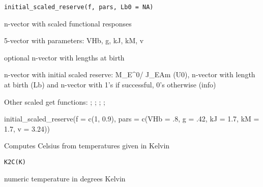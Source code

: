 \documentclass[a4paper]{book}
\begin{document}
%
\begin{Usage}
\begin{verbatim}
initial_scaled_reserve(f, pars, Lb0 = NA)
\end{verbatim}
\end{Usage}
%
\begin{Arguments}
\begin{ldescription}
\item[\code{f}] n-vector with scaled functional responses

\item[\code{pars}] 5-vector with parameters: VHb, g, kJ, kM, v

\item[\code{Lb0}] optional n-vector with lengths at birth
\end{ldescription}
\end{Arguments}
%
\begin{Value}
n-vector with initial scaled reserve: M\_E\textasciicircum{}0/ J\_EAm (U0), n-vector with length at birth (Lb) and n-vector with 1's if successful, 0's otherwise (info)
\end{Value}
%
\begin{SeeAlso}\relax
Other scaled get functions: ;
; ;
; 
\end{SeeAlso}
%
\begin{Examples}
\begin{ExampleCode}
initial_scaled_reserve(f = c(1, 0.9), pars = c(VHb = .8, g = .42, kJ = 1.7, kM = 1.7, v = 3.24))
\end{ExampleCode}
\end{Examples}
%
\begin{Description}\relax
Computes Celsius from temperatures given in Kelvin
\end{Description}
%
\begin{Usage}
\begin{verbatim}
K2C(K)
\end{verbatim}
\end{Usage}
%
\begin{Arguments}
\begin{ldescription}
\item[\code{K}] numeric temperature in degrees Kelvin
\end{ldescription}
\end{Arguments}
\end{document}
